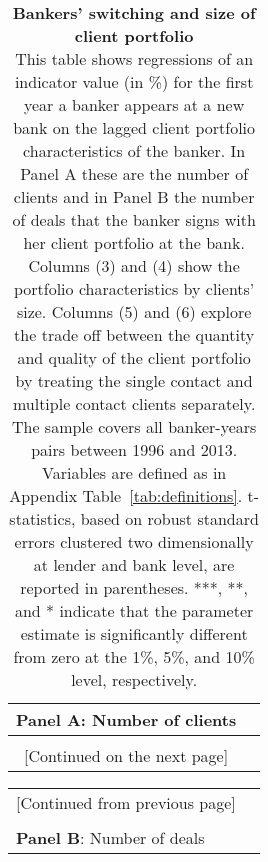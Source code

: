 \begin{table}[H] \begin{center} 
	\caption{\textbf{Bankers' switching and size of client portfolio} \\ This table shows regressions of an indicator value (in \%) for the first year a banker appears at a new bank on the lagged client portfolio characteristics of the banker. In Panel A these are the number of clients and in Panel B the number of deals  that the banker signs with her client portfolio at the bank. Columns (3) and (4) show the portfolio characteristics by clients' size. Columns (5) and (6) explore the trade off between the quantity and quality of the client portfolio by treating the single contact and multiple contact clients separately. The sample covers all banker-years pairs between 1996 and 2013. Variables are defined as in Appendix Table~\ref{tab:definitions}. t-statistics, based on robust standard errors clustered two dimensionally at lender and bank level, are reported in parentheses. ***, **, and * indicate that the parameter estimate is significantly different from zero at the 1\%, 5\%, and 10\% level, respectively.} 
		\label{tab:banker_clientno} 
	\begin{threeparttable} 
		\begin{tabular*}{\hsize} {@{\hskip\tabcolsep\extracolsep\fill}l*{7}{c}}
		 \multicolumn{7}{l}{\textbf{Panel A}: Number of clients} \\ \toprule 

		 			  
		 		\bottomrule 
		 \\ \multicolumn{7}{c}{[Continued on the next page]} 
\end{tabular*} 	\end{threeparttable}  \end{center} \end{table}

\begin{table}[H] \begin{center} \begin{threeparttable} 
 		\begin{tabular*}{\hsize} {@{\hskip\tabcolsep\extracolsep\fill}l*{7}{c}}
 		 	 \multicolumn{7}{c}{[Continued from previous page]} \\ \\
	 	 \multicolumn{7}{l}{\textbf{Panel B}: Number of deals} \\
			\toprule 

			
					\bottomrule 
	\end{tabular*} 	 \end{threeparttable}   \end{center} \end{table}
\clearpage \newpage


